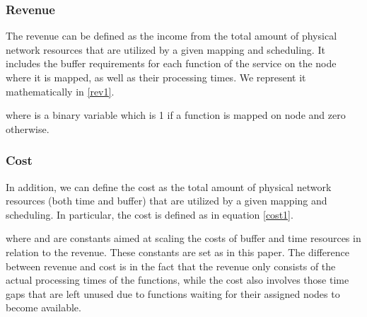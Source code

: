 \documentclass[conference]{IEEEtran}
\begin{document}
\subsubsection{Revenue}
The revenue  can be defined as the income from the total amount of physical network resources that are utilized by a given mapping and scheduling. It includes the buffer requirements for each function of the service on the node where it is mapped, as well as their processing times. We represent it mathematically in \eqref{rev1}.


where  is a binary variable which is 1 if a function  is mapped on node  and zero otherwise.  
\subsubsection{Cost}
In addition, we can define the cost  as the total amount of physical network resources (both time and buffer) that are utilized by a given mapping and scheduling. In particular, the cost is defined as in equation \eqref{cost1}.



where  and  are constants aimed at scaling the costs of buffer and time resources in relation to the revenue. These constants are set as  in this paper. The difference between revenue and cost is in the fact that the revenue only consists of the actual processing times of the functions, while the cost also involves those time gaps that are left unused due to functions waiting for their assigned nodes to become available.
\end{document}
